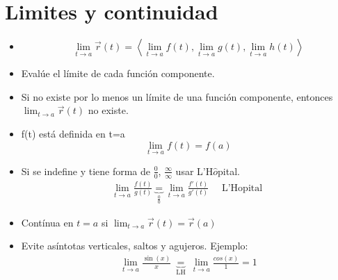 \documentclass{article}
\begin{document}
\section{Limites y continuidad}
\begin{itemize}
    \item \[
        \lim_{t \to a}\vec{r}(t) = \left\langle \lim_{t \to a} f(t),\lim_{t \to a} g(t),\lim_{t \to a} h(t) \right\rangle 
      \]
    
    \item Evalúe el límite de cada función componente.
    \item Si no existe por lo menos un límite de una función componente, entonces $\lim_{t \to a} \vec{r}(t) $ no existe.
    \item f(t) está definida en t=a
    \[
      \lim_{t \to a} f(t) = f(a)
    \]
    
    \item Si se indefine y tiene forma de $\frac{0}{0} $, $\frac{\infty}{\infty} $ usar L'H$\hat{o}$pital.
        \begin{align*}
            \lim_{t \to a} \frac{f(t)}{g(t)} \underbrace{=}_{\frac{0}{0} } \lim_{t \to a} \frac{f'(t)}{g'(t)} \quad \text{  L'Hopital  }
        \end{align*}
    
    \item Contínua en $t=a$ si $\lim_{t \to a} \vec{r}(t)=\vec{r}(a)$
    \item Evite asíntotas verticales, saltos y agujeros. Ejemplo: 
        \begin{align*} 
            \lim_{t \to a} \frac{\sin(x)}{x} \underbrace{=}_{\text{  LH  }} \lim_{t \to a} \frac{cos(x)}{1} = 1 \\ 
        \end{align*}
    
\end{itemize}


\end{document}
